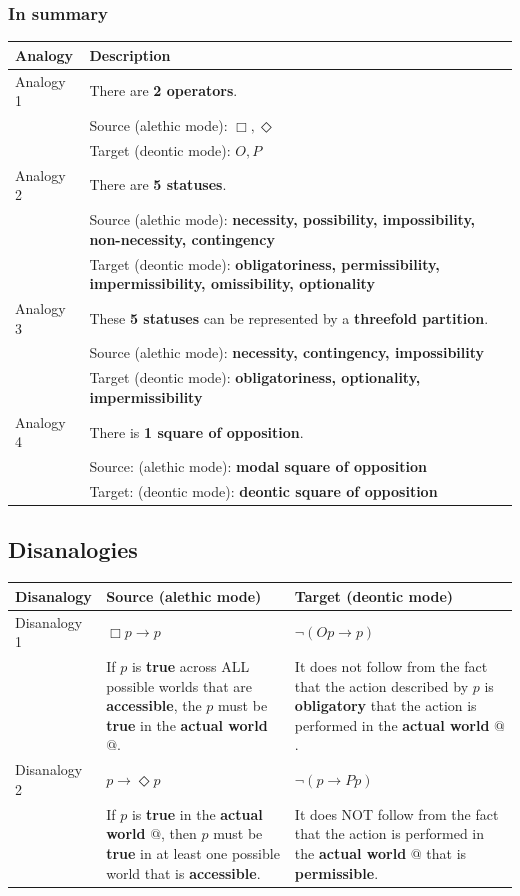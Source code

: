 \documentclass[11pt]{article}
\begin{document}
\subsubsection{In summary}
\label{sec:org90dfd97}
\begin{center}
\begin{tabular}{|m{5em}|m{25em}|}
\hline
Analogy & Description\\
\hline
Analogy 1 & There are \textbf{2 operators}.\\
 & Source (alethic mode): \(\Box, \Diamond\)\\
 & Target (deontic mode): \(O, P\)\\
\hline
Analogy 2 & There are \textbf{5 statuses}.\\
 & Source (alethic mode): \textbf{necessity, possibility, impossibility, non-necessity, contingency}\\
 & Target (deontic mode): \textbf{obligatoriness, permissibility, impermissibility, omissibility, optionality}\\
\hline
Analogy 3 & These \textbf{5 statuses} can be represented by a \textbf{threefold partition}.\\
 & Source (alethic mode): \textbf{necessity, contingency, impossibility}\\
 & Target (deontic mode): \textbf{obligatoriness, optionality, impermissibility}\\
\hline
Analogy 4 & There is \textbf{1 square of opposition}.\\
 & Source: (alethic mode): \textbf{modal square of opposition}\\
 & Target: (deontic mode): \textbf{deontic square of opposition}\\
\hline
\end{tabular}
\end{center}
\subsection{Disanalogies}
\label{sec:org6714fb9}
\begin{center}
\begin{tabularx}{\textwidth}{|X|X|X|}
\hline
Disanalogy & Source (alethic mode) & Target (deontic mode)\\
\hline
Disanalogy 1 & \(\Box p \rightarrow p\) & \(\neg (Op \rightarrow p)\)\\
 & If \(p\) is \textbf{true} across ALL possible worlds that are \textbf{accessible}, the \(p\) must be \textbf{true} in the \textbf{actual world} \(@\). & It does not follow from the fact that the action described by \(p\) is \textbf{obligatory} that the action is performed in the \textbf{actual world} \(@\).\\
\hline
Disanalogy 2 & \(p \rightarrow \Diamond p\) & \(\neg (p \rightarrow Pp)\)\\
 & If \(p\) is \textbf{true} in the \textbf{actual world} \(@\), then \(p\) must be \textbf{true} in at least one possible world that is \textbf{accessible}. & It does NOT follow from the fact that the action is performed in the \textbf{actual world} \(@\) that is \textbf{permissible}.\\
\hline
\end{tabularx}
\end{center}
\end{document}
